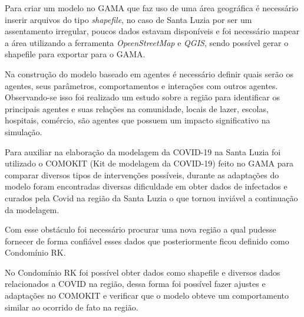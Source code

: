 Para criar um modelo no GAMA que faz uso de uma área geográfica é necessário inserir arquivos do tipo \textit{shapefile}, no caso de Santa Luzia por ser um assentamento irregular, poucos dados estavam disponíveis e foi necessário mapear a área utilizando a ferramenta \textit{OpeenStreetMap} e \textit{QGIS}, sendo possível gerar o shapefile para exportar para o GAMA.

Na construção do modelo baseado em agentes é necessário definir quais serão os agentes, seus parâmetros, comportamentos e interações com outros agentes. Observando-se isso foi realizado um estudo sobre a região para identificar os principais agentes e suas relações na comunidade, locais de lazer, escolas, hospitais, comércio, são agentes que possuem um impacto significativo na simulação.

Para auxiliar na elaboração da modelagem da COVID-19 na Santa Luzia foi utilizado o COMOKIT (Kit de modelagem da COVID-19) feito no GAMA para comparar diversos tipos de intervenções possíveis, durante as adaptações do modelo foram encontradas diversas dificuldade em obter dados de infectados e curados pela Covid na região da Santa Luzia o que tornou inviável a continuação da modelagem.

Com esse obstáculo foi necessário procurar uma nova região a qual pudesse fornecer de forma confiável esses dados que posteriormente ficou definido como Condomínio RK.

No Condomínio RK foi possível obter dados como shapefile e diversos dados relacionados a COVID na região, dessa forma foi possível fazer ajustes e adaptações no COMOKIT e verificar que o modelo obteve um comportamento similar ao ocorrido de fato na região.






